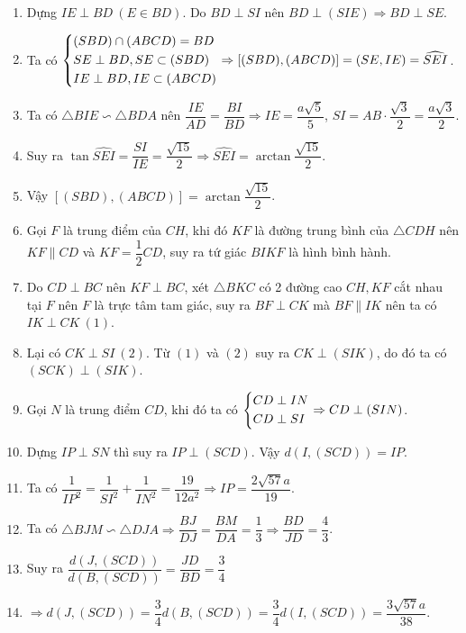 \begin{bt}
{\begin{enumerate}
			\item Dựng $IE\perp BD\ (E\in BD)$. Do $BD\perp SI$ nên $BD\perp(SIE)\Rightarrow BD\perp SE$.
			\item[] Ta có $\left\{\begin{aligned}& (SBD)\cap (ABCD)=BD\\& SE\perp BD, SE\subset (SBD)\\& IE\perp BD, IE\subset (ABCD)\end{aligned}\right.\Rightarrow [(SBD),(ABCD)]=(SE,IE)=\widehat{SEI}$.
			\item[] Ta có $\triangle BIE\backsim\triangle BDA$ nên $\dfrac{IE}{AD}=\dfrac{BI}{BD}\Rightarrow IE=\dfrac{a\sqrt5}{5}$, $SI=AB\cdot\dfrac{\sqrt3}{2}=\dfrac{a\sqrt3}{2}$.
			\item[] Suy ra $\tan\widehat{SEI}=\dfrac{SI}{IE}=\dfrac{\sqrt{15}}{2}\Rightarrow \widehat{SEI}=\arctan\dfrac{\sqrt{15}}{2}$.
			\item[] Vậy $[(SBD),(ABCD)]=\arctan\dfrac{\sqrt{15}}{2}$.
			
			\item Gọi $F$ là trung điểm của $CH$, khi đó $KF$ là đường trung bình của $\triangle CDH$ nên $KF\parallel CD$ và $KF=\dfrac{1}{2}CD$, suy ra tứ giác $BIKF$ là hình bình hành. 
			\item[] Do $CD\perp BC$ nên $KF\perp BC$, xét $\triangle BKC$ có 2 đường cao $CH,KF$ cắt nhau tại $F$ nên $F$ là trực tâm tam giác, suy ra $BF\perp CK$ mà $BF\parallel IK$ nên ta có $IK\perp CK\ (1)$.
			\item[] Lại có $CK\perp SI\ (2)$. Từ $(1)$ và $(2)$ suy ra $CK\perp(SIK)$, do đó ta có $(SCK)\perp(SIK)$.
			
			\item Gọi $N$ là trung điểm $CD$, khi đó ta có $\left\{\begin{aligned}& CD\perp IN\\& CD\perp SI\end{aligned}\right.\Rightarrow CD\perp(SIN)$.
			\item[] Dựng $IP\perp SN$ thì suy ra $IP\perp(SCD)$. Vậy $d(I,(SCD))=IP$.
			\item[] Ta có $\dfrac{1}{IP^2}=\dfrac{1}{SI^2}+\dfrac{1}{IN^2}=\dfrac{19}{12a^2}\Rightarrow IP=\dfrac{2\sqrt{57}a}{19}$.
			\item[] Ta có $\triangle BJM\backsim\triangle DJA\Rightarrow \dfrac{BJ}{DJ}=\dfrac{BM}{DA}=\dfrac{1}{3}\Rightarrow \dfrac{BD}{JD}=\dfrac{4}{3}$.
			\item[] Suy ra $\dfrac{d(J,(SCD))}{d(B,(SCD))}=\dfrac{JD}{BD}=\dfrac{3}{4}$
			\item[] $\Rightarrow d(J,(SCD))=\dfrac{3}{4}d(B,(SCD))=\dfrac{3}{4}d(I,(SCD))=\dfrac{3\sqrt{57}a}{38}$.
		\end{enumerate}
		
		
		
	}
\end{bt}